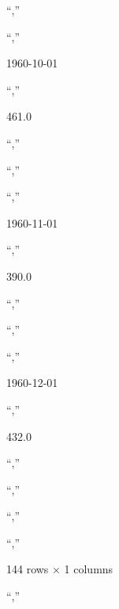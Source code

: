\documentclass[
]{article}
\begin{document}
\n``,''

\n``,''

1960-10-01

\n``,''

461.0

\n``,''

\n``,''

\n``,''

1960-11-01

\n``,''

390.0

\n``,''

\n``,''

\n``,''

1960-12-01

\n``,''

432.0

\n``,''

\n``,''

\n``,''

\n``,''

144 rows × 1 columns

\n``,''
\end{document}
